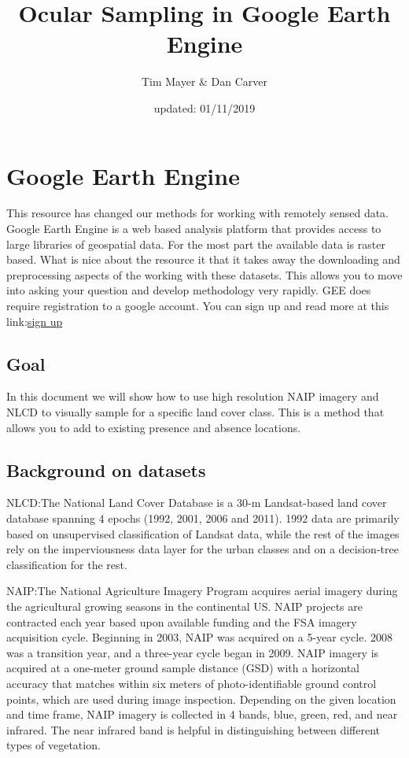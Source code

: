 \documentclass[]{article}
\title{Ocular Sampling in Google Earth Engine}
\author{Tim Mayer \& Dan Carver}
\date{updated: 01/11/2019}
\begin{document}
\maketitle

{
\setcounter{tocdepth}{2}
\tableofcontents
}
\section{Google Earth Engine}\label{google-earth-engine}

This resource has changed our methods for working with remotely sensed
data. Google Earth Engine is a web based analysis platform that provides
access to large libraries of geospatial data. For the most part the
available data is raster based. What is nice about the resource it that
it takes away the downloading and preprocessing aspects of the working
with these datasets. This allows you to move into asking your question
and develop methodology very rapidly. GEE does require registration to a
google account. You can sign up and read more at this
link:\href{https://earthengine.google.com/}{sign up}

\subsection{Goal}\label{goal}

In this document we will show how to use high resolution NAIP imagery
and NLCD to visually sample for a specific land cover class. This is a
method that allows you to add to existing presence and absence
locations.

\subsection{Background on datasets}\label{background-on-datasets}

NLCD:The National Land Cover Database is a 30-m Landsat-based land cover
database spanning 4 epochs (1992, 2001, 2006 and 2011). 1992 data are
primarily based on unsupervised classification of Landsat data, while
the rest of the images rely on the imperviousness data layer for the
urban classes and on a decision-tree classification for the rest.

NAIP:The National Agriculture Imagery Program acquires aerial imagery
during the agricultural growing seasons in the continental US. NAIP
projects are contracted each year based upon available funding and the
FSA imagery acquisition cycle. Beginning in 2003, NAIP was acquired on a
5-year cycle. 2008 was a transition year, and a three-year cycle began
in 2009. NAIP imagery is acquired at a one-meter ground sample distance
(GSD) with a horizontal accuracy that matches within six meters of
photo-identifiable ground control points, which are used during image
inspection. Depending on the given location and time frame, NAIP imagery
is collected in 4 bands, blue, green, red, and near infrared. The near
infrared band is helpful in distinguishing between different types of
vegetation.
\end{document}
